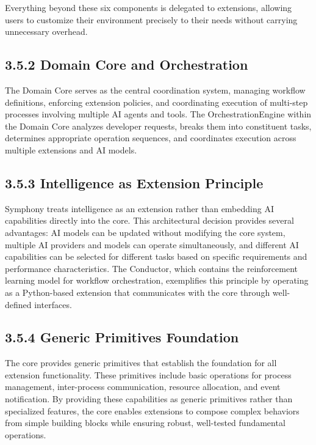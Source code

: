 Everything beyond these six components is delegated to extensions, allowing users to customize their environment precisely to their needs without carrying unnecessary overhead.

\subsection*{3.5.2 Domain Core and Orchestration}

The Domain Core serves as the central coordination system, managing workflow definitions, enforcing extension policies, and coordinating execution of multi-step processes involving multiple AI agents and tools. The OrchestrationEngine within the Domain Core analyzes developer requests, breaks them into constituent tasks, determines appropriate operation sequences, and coordinates execution across multiple extensions and AI models.

\clearpage
\subsection*{3.5.3 Intelligence as Extension Principle}

Symphony treats intelligence as an extension rather than embedding AI capabilities directly into the core. This architectural decision provides several advantages: AI models can be updated without modifying the core system, multiple AI providers and models can operate simultaneously, and different AI capabilities can be selected for different tasks based on specific requirements and performance characteristics. The Conductor, which contains the reinforcement learning model for workflow orchestration, exemplifies this principle by operating as a Python-based extension that communicates with the core through well-defined interfaces.

\subsection*{3.5.4 Generic Primitives Foundation}

The core provides generic primitives that establish the foundation for all extension functionality. These primitives include basic operations for process management, inter-process communication, resource allocation, and event notification. By providing these capabilities as generic primitives rather than specialized features, the core enables extensions to compose complex behaviors from simple building blocks while ensuring robust, well-tested fundamental operations.
